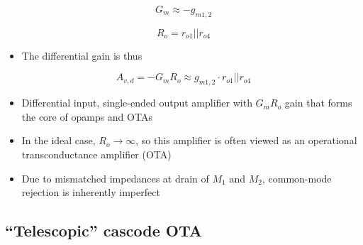 \documentclass[11pt]{article}
\providecommand{\tightlist}{%
      \setlength{\itemsep}{0pt}\setlength{\parskip}{0pt}}
\begin{document}
\begin{equation}
G_m \approx -g_{m1,2}
\end{equation}

\begin{equation}
R_o = r_{o1}||r_{o4}
\end{equation}

\begin{itemize}
\tightlist
\item
  The differential gain is thus
\end{itemize}

\begin{equation}
\boxed{A_{v,d} = -G_m R_o \approx g_{m1,2}\cdot r_{o1}||r_{o4}}
\end{equation}

    \begin{itemize}
\tightlist
\item
  Differential input, single-ended output amplifier with \(G_m R_o\)
  gain that forms the core of opamps and OTAs
\item
  In the ideal case, \(R_o \rightarrow \infty\), so this amplifier is
  often viewed as an operational transconductance amplifier (OTA)
\item
  Due to mismatched impedances at drain of \(M_1\) and \(M_2\),
  common-mode rejection is inherently imperfect
\end{itemize}

    \hypertarget{telescopic-cascode-ota}{%
\subsection{``Telescopic'' cascode OTA}\label{telescopic-cascode-ota}}
\end{document}
